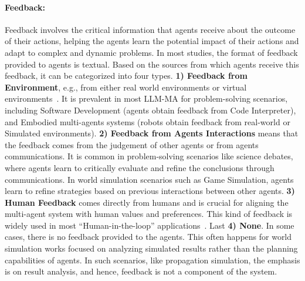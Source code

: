\paragraph{Feedback:} Feedback involves the critical information that agents receive about the outcome of their actions, helping the agents learn the potential impact of their actions and adapt to complex and dynamic problems. In most studies, the format of feedback provided to agents is textual. Based on the sources from which agents receive this feedback, it can be categorized into four types. \textbf{1) Feedback from Environment}, e.g.,  from either real world environments or   virtual environments~\cite{wang2023survey}. It is prevalent in most LLM-MA for problem-solving scenarios, including Software Development (agents obtain feedback from Code Interpreter), and Embodied multi-agents systems (robots obtain feedback from real-world or Simulated environments). \textbf{2) Feedback from Agents Interactions}  means that the feedback comes from the judgement of other agents or from agents communications. It is common in problem-solving scenarios like science debates, where agents learn to  critically evaluate and refine the conclusions through communications. In  world simulation scenarios such as Game Simulation,  agents learn to refine strategies based on previous interactions between other agents. \textbf{3)  Human Feedback} comes directly from humans and is crucial for aligning the multi-agent system with human values and preferences.   This kind of feedback is widely used in most ``Human-in-the-loop'' applications~\cite{wang2021putting}. Last \textbf{4) None}.  In some cases, there is no feedback provided to  the agents. This  often happens for world simulation works focused on analyzing simulated results rather than the planning capabilities of agents. In such scenarios, like propagation simulation, the emphasis is on result analysis, and hence, feedback is not a component of the system. 

